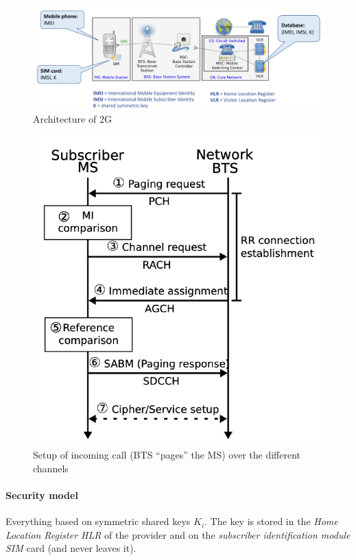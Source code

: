 \begin{figure}[h]
	\centering
	\includegraphics[scale=0.5]{images/10-2g-arch.png}
	\caption{Architecture of 2G}
	\label{fig:2g-arch}
\end{figure}

\begin{figure}
	\centering
	\includegraphics[scale=0.4]{images/10-2g-channels.png}
	\caption{Setup of incoming call (BTS ``pages'' the MS) over the different channels}
	\label{fig:2g-channels}
\end{figure}

\paragraph{Security model}
Everything based on symmetric shared keys $K_i$.
The key is stored in the \textit{Home Location Register HLR} of the provider and on the \textit{subscriber identification module SIM} card (and never leaves it).

